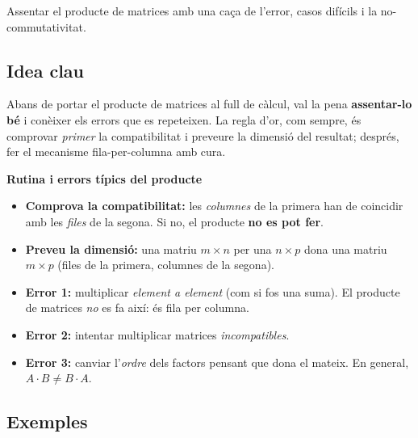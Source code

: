 %
{Assentar el producte de matrices amb una caça de l'error, casos difícils i la no-commutativitat.}

\subsection{Idea clau}

Abans de portar el producte de matrices al full de càlcul, val la pena
\textbf{assentar-lo bé} i conèixer els errors que es repeteixen. La regla d'or, com
sempre, és comprovar \emph{primer} la compatibilitat i preveure la dimensió del
resultat; després, fer el mecanisme fila-per-columna amb cura.

\begin{idea}
\textbf{Rutina i errors típics del producte}
\begin{itemize}[leftmargin=1.4em, itemsep=2pt]
  \item \textbf{Comprova la compatibilitat:} les \emph{columnes} de la primera han
        de coincidir amb les \emph{files} de la segona. Si no, el producte
        \textbf{no es pot fer}.
  \item \textbf{Preveu la dimensió:} una matriu $m\times n$ per una $n\times p$
        dona una matriu $m\times p$ (files de la primera, columnes de la segona).
  \item \textbf{Error 1:} multiplicar \emph{element a element} (com si fos una
        suma). El producte de matrices \emph{no} es fa així: és fila per columna.
  \item \textbf{Error 2:} intentar multiplicar matrices \emph{incompatibles}.
  \item \textbf{Error 3:} canviar l'\emph{ordre} dels factors pensant que dona el
        mateix. En general, $A\cdot B\neq B\cdot A$.
\end{itemize}
\end{idea}

\subsection{Exemples}

